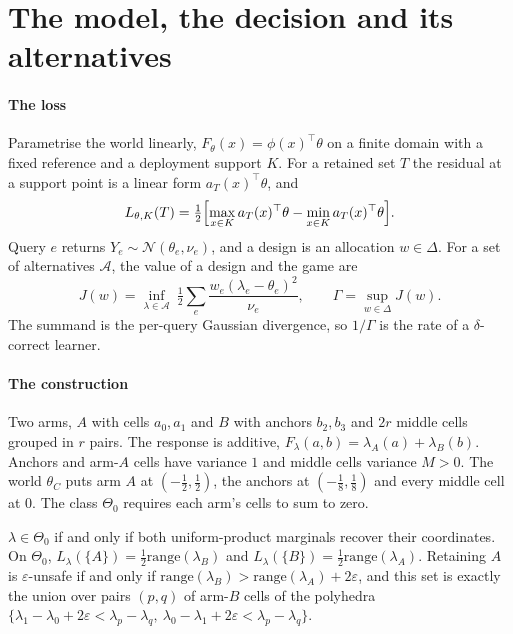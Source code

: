 \section{The model, the decision and its alternatives}
\label{sec:model}

\paragraph{The loss} Parametrise the world linearly, $F_{\theta}(x)=\phi(x)^{\top}\theta$ on a
finite domain with a fixed reference and a deployment support $K$. For a retained set $T$ the
residual at a support point is a linear form $a_{T}(x)^{\top}\theta$, and
\begin{equation}
L_{\theta,K}(T)=\tfrac12\Bigl[\max_{x\in K}a_{T}(x)^{\top}\theta
-\min_{x\in K}a_{T}(x)^{\top}\theta\Bigr].
\label{eq:loss}
\end{equation}
Query $e$ returns $Y_{e}\sim\mathcal N(\theta_{e},\nu_{e})$, and a design is an allocation
$w\in\Delta$. For a set of alternatives $\mathcal A$, the value of a design and the game are
\begin{equation}
J(w)=\inf_{\lambda\in\mathcal A}\ \tfrac12\sum_{e}\frac{w_{e}(\lambda_{e}-\theta_{e})^{2}}{\nu_{e}},
\qquad \Gamma=\sup_{w\in\Delta}J(w).
\label{eq:game}
\end{equation}
The summand is the per-query Gaussian divergence, so $1/\Gamma$ is the rate of a
$\delta$-correct learner.


\paragraph{The construction} Two arms, $A$ with cells $a_{0},a_{1}$ and $B$ with anchors
$b_{2},b_{3}$ and $2r$ middle cells grouped in $r$ pairs. The response is additive,
$F_{\lambda}(a,b)=\lambda_{A}(a)+\lambda_{B}(b)$. Anchors and arm-$A$ cells have variance $1$
and middle cells variance $M>0$. The world $\theta_{C}$ puts arm $A$ at $(-\frac12,\frac12)$,
the anchors at $(-\frac18,\frac18)$ and every middle cell at $0$. The class $\Theta_{0}$
requires each arm's cells to sum to zero.

\begin{theorem}
\label{thm:bridge}
$\lambda\in\Theta_{0}$ if and only if both uniform-product marginals recover their coordinates.
On $\Theta_{0}$, $L_{\lambda}(\{A\})=\frac12\mathrm{range}(\lambda_{B})$ and
$L_{\lambda}(\{B\})=\frac12\mathrm{range}(\lambda_{A})$. Retaining $A$ is $\varepsilon$-unsafe
if and only if $\mathrm{range}(\lambda_{B})>\mathrm{range}(\lambda_{A})+2\varepsilon$, and this
set is exactly the union over pairs $(p,q)$ of arm-$B$ cells of the polyhedra
$\{\lambda_{1}-\lambda_{0}+2\varepsilon<\lambda_{p}-\lambda_{q},\
\lambda_{0}-\lambda_{1}+2\varepsilon<\lambda_{p}-\lambda_{q}\}$.
\end{theorem}

